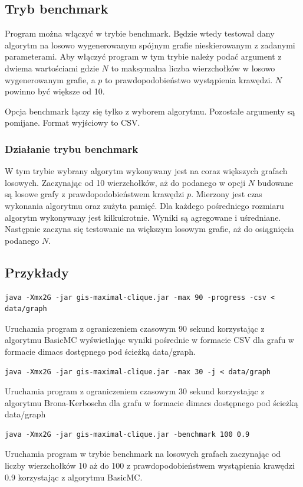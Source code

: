 \documentclass[12pt, a4paper]{article}
\begin{document}
\subsection{Tryb benchmark}
Program można włączyć w trybie benchmark. Będzie wtedy testował dany algorytm na losowo wygenerowanym spójnym grafie nieskierowanym z zadanymi parameterami. Aby włączyć program w tym trybie należy podać argument z dwiema wartościami \emph{} gdzie $N$ to maksymalna liczba wierzchołków w losowo wygenerowanym grafie, a $p$ to prawdopodobieństwo wystąpienia krawędzi. $N$ powinno być większe od 10.

Opcja benchmark łączy się tylko z wyborem algorytmu. Pozostałe argumenty są pomijane. Format wyjściowy to CSV.

\subsubsection{Działanie trybu benchmark}
W tym trybie wybrany algorytm wykonywany jest na coraz większych grafach losowych. Zaczynając od 10 wierzchołków, aż do podanego w opcji $N$ budowane są losowe grafy z prawdopodobieństwem krawędzi $p$. Mierzony jest czas wykonania algorytmu oraz zużyta pamięć. Dla każdego pośredniego rozmiaru algorytm wykonywany jest kilkukrotnie. Wyniki są agregowane i uśredniane. Następnie zaczyna się testowanie na większym losowym grafie, aż do osiągnięcia podanego $N$.

\subsection{Przykłady}

\begin{verbatim}
java -Xmx2G -jar gis-maximal-clique.jar -max 90 -progress -csv < data/graph
\end{verbatim}
Uruchamia program z ograniczeniem czasowym 90 sekund korzystając z algorytmu BasicMC wyświetlając wyniki pośrednie w formacie CSV dla grafu w formacie dimacs dostępnego pod ścieżką data/graph.

\begin{verbatim}
java -Xmx2G -jar gis-maximal-clique.jar -max 30 -j < data/graph 
\end{verbatim}
Uruchamia program z ograniczeniem czasowym 30 sekund korzystając z algorytmu Brona-Kerboscha dla grafu w formacie dimacs dostępnego pod ścieżką data/graph

\begin{verbatim}
java -Xmx2G -jar gis-maximal-clique.jar -benchmark 100 0.9
\end{verbatim}
Uruchamia program w trybie benchmark na losowych grafach zaczynając od liczby wierzchołków 10 aż do 100 z prawdopodobieństwem wystąpienia krawędzi 0.9 korzystając z algorytmu BasicMC.
\end{document}
